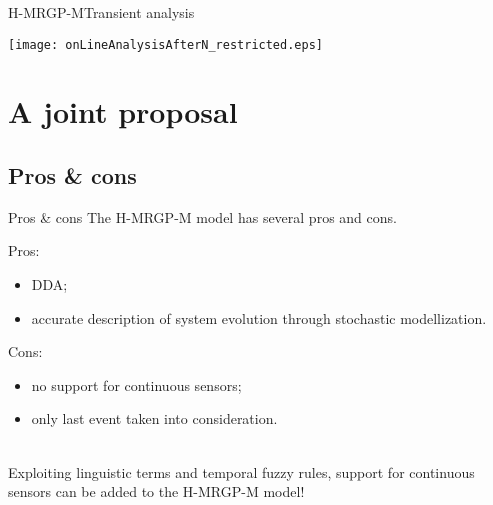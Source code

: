 \documentclass[9pt, handout]{beamer}
\begin{document}
      \begin{frame}{H-MRGP-M}{Transient analysis}
        \begin{center}
          \texttt{[image: onLineAnalysisAfterN\_restricted.eps]}
        \end{center}
      \end{frame}
      
  \section{A joint proposal}
    \subsection{Pros \& cons}
      \begin{frame}{Pros \& cons}
        \pause
        The H-MRGP-M model has several pros and cons.\\
        \pause
        \vspace{1em}
        \begin{minipage}{0.4\linewidth}
          Pros:
          \begin{itemize}
            \item DDA;
            \item accurate description of system evolution through stochastic modellization.
          \end{itemize}
        \end{minipage}
        \pause
        \begin{minipage}{0.4\linewidth}
          Cons:
          \begin{itemize}
            \item no support for continuous sensors;
            \item only last event taken into consideration.
          \end{itemize}
        \end{minipage}\\
        \pause
        \vspace{2em}
        Exploiting linguistic terms and temporal fuzzy rules, support for continuous sensors can be added to the H-MRGP-M model!
      \end{frame}
    
\end{document}
